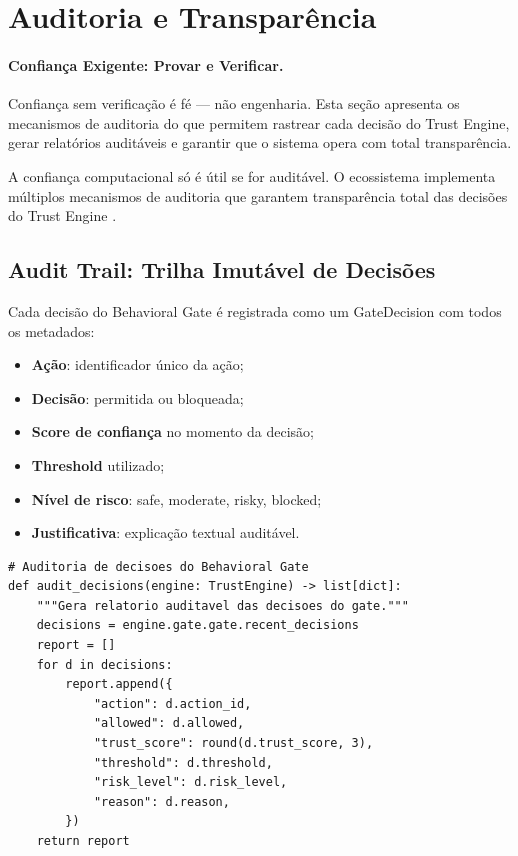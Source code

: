 \section{Auditoria e Transparência}
\label{sec:auditoria}
\nivelintermediario

\paragraph{Confiança Exigente: Provar e Verificar.}
Confiança sem verificação é fé --- não engenharia.
Esta seção apresenta os mecanismos de auditoria do
\opencodeeco{} que permitem rastrear cada decisão do
Trust Engine, gerar relatórios auditáveis e garantir que
o sistema opera com total transparência.

A confiança computacional só é útil se for auditável. O ecossistema
implementa múltiplos mecanismos de auditoria que garantem
transparência total das decisões do Trust Engine \cite{opencode2026spec038,
opencode2026ecosystem}.

\subsection{Audit Trail: Trilha Imutável de Decisões}

Cada decisão do Behavioral Gate é registrada como um GateDecision com
todos os metadados:

\begin{itemize}
\item \textbf{Ação}: identificador único da ação;
\item \textbf{Decisão}: permitida ou bloqueada;
\item \textbf{Score de confiança} no momento da decisão;
\item \textbf{Threshold} utilizado;
\item \textbf{Nível de risco}: safe, moderate, risky, blocked;
\item \textbf{Justificativa}: explicação textual auditável.
\end{itemize}

\begin{lstlisting}[style=pythonstyle]
# Auditoria de decisoes do Behavioral Gate
def audit_decisions(engine: TrustEngine) -> list[dict]:
    """Gera relatorio auditavel das decisoes do gate."""
    decisions = engine.gate.gate.recent_decisions
    report = []
    for d in decisions:
        report.append({
            "action": d.action_id,
            "allowed": d.allowed,
            "trust_score": round(d.trust_score, 3),
            "threshold": d.threshold,
            "risk_level": d.risk_level,
            "reason": d.reason,
        })
    return report
\end{lstlisting}

